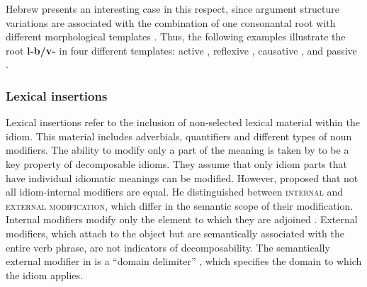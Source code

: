 \documentclass[output=paper]{langsci/langscibook}
\begin{document}
Hebrew presents an interesting case in this respect, since argument structure variations are associated with the combination of one consonantal root with different
morphological templates \citep{doron08,doron03agency}. Thus, the following examples illustrate the root \textbf{l-b/v-{\shin}} in four different templates: active , reflexive , causative , and passive .
\eal
\zl


\subsubsection{Lexical insertions}

Lexical insertions refer to the inclusion of non-selected lexical material within the idiom. This material includes adverbials, quantifiers and different types of noun modifiers.
The ability to modify only a part of the meaning is taken by
\citet{nunberg94} to be a key property of decomposable
idioms. They assume that only idiom parts that have individual idiomatic meanings can be modified.
However, \citet{ernst81} proposed that not all idiom-internal modifiers are equal. He distinguished between {\scshape internal} and {\scshape external modification}, which differ in the semantic scope of their modification. Internal modifiers modify only the element to which they are adjoined . External modifiers, which attach to the object but
are semantically associated with the entire verb phrase, are not indicators of decomposability. The semantically external modifier in  is a ``domain delimiter'' \citep{ernst81}, which specifies the domain to which the idiom applies.
\end{document}
